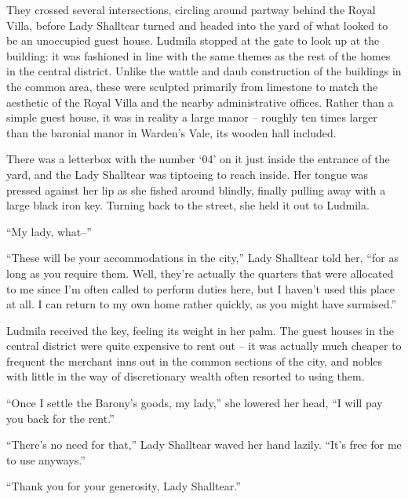  

They crossed several intersections, circling around partway behind the Royal Villa, before Lady Shalltear turned and headed into the yard of what looked to be an unoccupied guest house. Ludmila stopped at the gate to look up at the building: it was fashioned in line with the same themes as the rest of the homes in the central district. Unlike the wattle and daub construction of the buildings in the common area, these were sculpted primarily from limestone to match the aesthetic of the Royal Villa and the nearby administrative offices. Rather than a simple guest house, it was in reality a large manor – roughly ten times larger than the baronial manor in Warden’s Vale, its wooden hall included.

 

There was a letterbox with the number ‘04’ on it just inside the entrance of the yard, and the Lady Shalltear was tiptoeing to reach inside. Her tongue was pressed against her lip as she fished around blindly, finally pulling away with a large black iron key. Turning back to the street, she held it out to Ludmila.

 

“My lady, what–”

 

“These will be your accommodations in the city,” Lady Shalltear told her, “for as long as you require them. Well, they’re actually the quarters that were allocated to me since I’m often called to perform duties here, but I haven’t used this place at all. I can return to my own home rather quickly, as you might have surmised.”

 

Ludmila received the key, feeling its weight in her palm. The guest houses in the central district were quite expensive to rent out – it was actually much cheaper to frequent the merchant inns out in the common sections of the city, and nobles with little in the way of discretionary wealth often resorted to using them.

 

“Once I settle the Barony’s goods, my lady,” she lowered her head, “I will pay you back for the rent.”

 

“There’s no need for that,” Lady Shalltear waved her hand lazily. “It's free for me to use anyways.”

 

“Thank you for your generosity, Lady Shalltear.”

